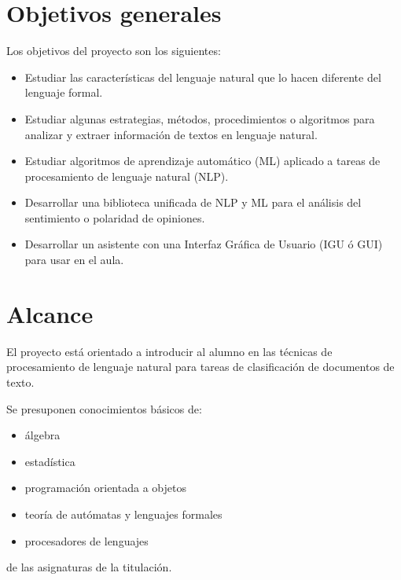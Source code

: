 


\section{Objetivos generales}
\label{sec:objetivos-generales}

Los objetivos del proyecto son los siguientes:

\begin{itemize}
\item Estudiar las características del lenguaje natural que lo hacen diferente del lenguaje formal.
\item Estudiar algunas estrategias, métodos, procedimientos o algoritmos para analizar y extraer información de textos en lenguaje natural.
\item Estudiar algoritmos de aprendizaje automático (ML) aplicado a tareas de procesamiento de lenguaje natural (NLP).
\item Desarrollar una biblioteca unificada de NLP y ML para el análisis del sentimiento o polaridad de opiniones.
\item Desarrollar un asistente con una Interfaz Gráfica de Usuario (IGU ó GUI) para usar en el aula.
\end{itemize}

\section{Alcance}

El proyecto está orientado a introducir al alumno en las técnicas de procesamiento de lenguaje natural para tareas de clasificación de documentos de texto.

Se presuponen conocimientos básicos de:
\begin{itemize}
\item álgebra
\item estadística
\item programación orientada a objetos
\item teoría de autómatas y lenguajes formales
\item procesadores de lenguajes
\end{itemize}
de las asignaturas de la titulación.

